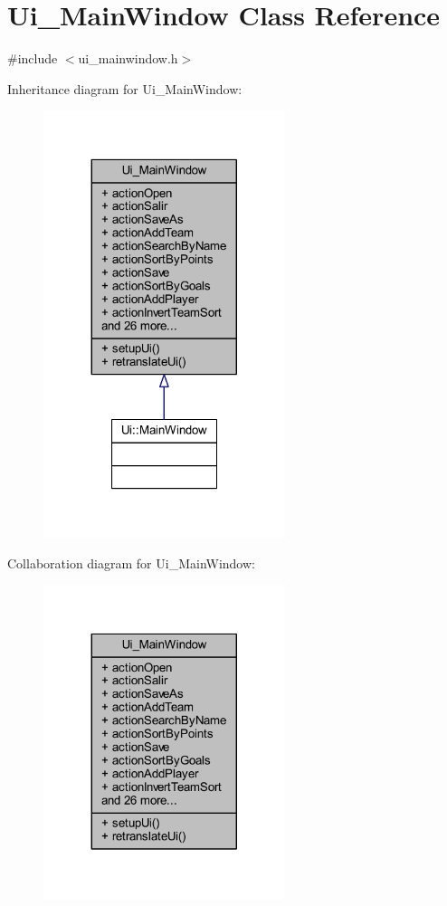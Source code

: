 \hypertarget{class_ui___main_window}{}\section{Ui\+\_\+\+Main\+Window Class Reference}
\label{class_ui___main_window}


{\ttfamily \#include $<$ui\+\_\+mainwindow.\+h$>$}



Inheritance diagram for Ui\+\_\+\+Main\+Window\+:
\nopagebreak
\begin{figure}[H]
\begin{center}
\leavevmode
\includegraphics[width=200pt]{dd/df1/class_ui___main_window__inherit__graph}
\end{center}
\end{figure}


Collaboration diagram for Ui\+\_\+\+Main\+Window\+:
\nopagebreak
\begin{figure}[H]
\begin{center}
\leavevmode
\includegraphics[width=200pt]{d5/d21/class_ui___main_window__coll__graph}
\end{center}
\end{figure}
